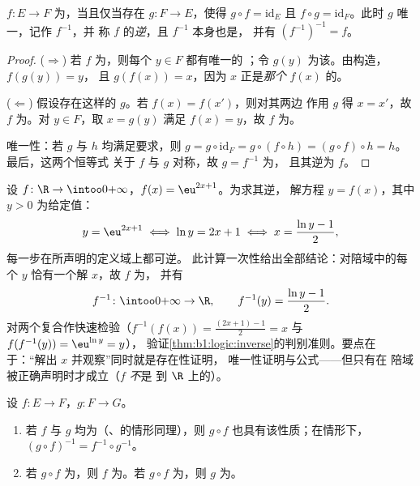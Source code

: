 \begin{theorem}[逆映射]\label{thm:b1:logic:inverse}
 $f \colon E \to F$ 为，当且仅当存在
$g \colon F \to E$，使得 $g \circ f = \mathrm{id}_E$ 且 $f \circ g =
\mathrm{id}_F$。此时 $g$ 唯一，记作 $f^{-1}$，并
称 $f$ 的\emph{逆}，且 $f^{-1}$ 本身也是，
并有 $(f^{-1})^{-1} = f$。
\end{theorem}

\begin{proof}
($\Rightarrow$) 若 $f$ 为，则每个 $y \in F$ 都有唯一的
；令 $g(y)$ 为该。由构造，$f(g(y)) = y$，
且 $g(f(x)) = x$，因为 $x$ 正是\emph{那个}
$f(x)$ 的。

($\Leftarrow$) 假设存在这样的 $g$。若 $f(x) = f(x')$，则对其两边
作用 $g$ 得 $x = x'$，故 $f$ 为。对 $y \in F$，取 $x = g(y)$
满足 $f(x) = y$，故 $f$ 为。

唯一性：若 $g$ 与 $h$ 均满足要求，则 $g = g \circ \mathrm{id}_F
= g \circ (f \circ h) = (g \circ f) \circ h = h$。最后，这两个恒等式
关于 $f$ 与 $g$ 对称，故 $g = f^{-1}$ 为，
且其逆为 $f$。
\end{proof}

\begin{example}[实际计算逆映射]\label{ex:b1:logic:inversecomp}
设 $f \colon \R \to \intoo0{+\infty}$，$f(x) = \eu^{2x+1}$。为求其逆，
解方程 $y = f(x)$，其中 $y > 0$ 为给定值：
\[
y = \eu^{2x+1} \iff \ln y = 2x + 1 \iff x = \frac{\ln y - 1}2 ,
\]
每一步在所声明的定义域上都可逆。
此计算一次性给出全部结论：对陪域中的每个 $y$
恰有一个解 $x$，故 $f$ 为，
并有
\[
f^{-1} \colon \intoo0{+\infty} \to \R,
\qquad
f^{-1}(y) = \frac{\ln y - 1}2 .
\]
对两个复合作快速检验（$f^{-1}(f(x)) = \frac{(2x+1) -
1}2 = x$ 与 $f(f^{-1}(y)) = \eu^{\ln y} = y$），
验证\cref{thm:b1:logic:inverse}的判别准则。要点在于：“解出
$x$ 并观察”同时就是存在性证明，
唯一性证明与公式——但只有在
陪域被正确声明时才成立（$f$ \emph{不}是
到 $\R$ 上的）。
\end{example}

\begin{proposition}[复合与三种性质]\label{prop:b1:logic:comp}
设 $f \colon E \to F$，$g \colon F \to G$。
\begin{enumerate}
  \item 若 $f$ 与 $g$ 均为（、的情形同理），则
        $g \circ f$ 也具有该性质；在情形下，$(g \circ f)^{-1} = f^{-1} \circ
        g^{-1}$。
  \item 若 $g \circ f$ 为，则 $f$ 为。若
        $g \circ f$ 为，则 $g$ 为。
\end{enumerate}
\end{proposition}

